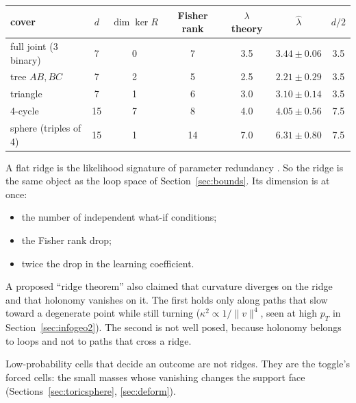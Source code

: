 \documentclass[11pt]{article}
\theoremstyle{definition}
\theoremstyle{remark}
\begin{document}
\begin{center}\small
\begin{tabular}{lcccccc}
\toprule
cover & $d$ & $\dim\ker R$ & Fisher rank & $\lambda$ theory & $\hat\lambda$ & $d/2$\\
\midrule
full joint (3 binary) & 7 & 0 & 7 & 3.5 & $3.44\pm0.06$ & 3.5\\
tree $AB,BC$ & 7 & 2 & 5 & 2.5 & $2.21\pm0.29$ & 3.5\\
triangle & 7 & 1 & 6 & 3.0 & $3.10\pm0.14$ & 3.5\\
4-cycle & 15 & 7 & 8 & 4.0 & $4.05\pm0.56$ & 7.5\\
sphere (triples of 4) & 15 & 1 & 14 & 7.0 & $6.31\pm0.80$ & 7.5\\
\bottomrule
\end{tabular}
\end{center}

A flat ridge is the likelihood signature of parameter redundancy \cite{catchpolemorgan97}. So the ridge is the same object as the loop space of Section~\ref{sec:bounds}. Its dimension is at once:
\begin{itemize}
  \item the number of independent what-if conditions;
  \item the Fisher rank drop;
  \item twice the drop in the learning coefficient.
\end{itemize}
A proposed ``ridge theorem'' also claimed that curvature diverges on the ridge and that holonomy vanishes on it. The first holds only along paths that slow toward a degenerate point while still turning ($\kappa^2\propto1/\|v\|^4$, seen at high $p_T$ in Section~\ref{sec:infogeo2}). The second is not well posed, because holonomy belongs to loops and not to paths that cross a ridge.

Low-probability cells that decide an outcome are not ridges. They are the toggle's forced cells: the small masses whose vanishing changes the support face (Sections~\ref{sec:toricsphere}, \ref{sec:deform}).
\end{document}
